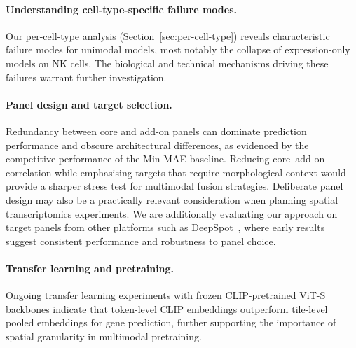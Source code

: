 \paragraph{Understanding cell-type-specific failure modes.}
Our per-cell-type analysis (Section~\ref{sec:per-cell-type}) reveals characteristic failure modes for unimodal models, most notably the collapse of expression-only models on NK cells. The biological and technical mechanisms driving these failures warrant further investigation.

\paragraph{Panel design and target selection.}
Redundancy between core and add-on panels can dominate prediction performance and obscure architectural differences, as evidenced by the competitive performance of the Min-MAE baseline. Reducing core--add-on correlation while emphasising targets that require morphological context would provide a sharper stress test for multimodal fusion strategies. Deliberate panel design may also be a practically relevant consideration when planning spatial transcriptomics experiments. We are additionally evaluating our approach on target panels from other platforms such as DeepSpot~\cite{nonchev_deepspotleveragingspatial_2025}, where early results suggest consistent performance and robustness to panel choice.

\paragraph{Transfer learning and pretraining.}
Ongoing transfer learning experiments with frozen CLIP-pretrained ViT-S backbones indicate that token-level CLIP embeddings outperform tile-level pooled embeddings for gene prediction, further supporting the importance of spatial granularity in multimodal pretraining.